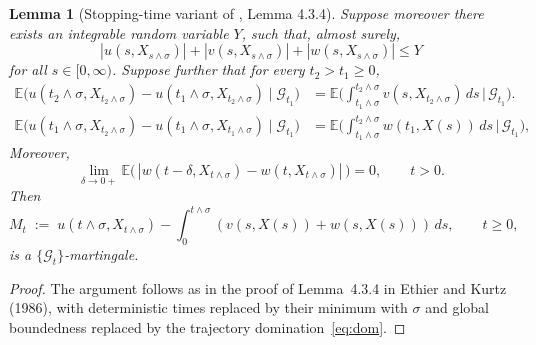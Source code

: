 \documentclass{imsart}
\theoremstyle{plain}
\newtheorem{lemma}[theorem]{Lemma}
\theoremstyle{definition}
\begin{document}
\begin{appendix}
\begin{lemma}[Stopping-time variant of \cite{EthierKurtz1986}, Lemma 4.3.4]
Suppose moreover there exists an integrable random variable $Y$, such that, almost surely,
\begin{equation}
\label{eq:dom}
  |u(s, X_{s \wedge \sigma})| + 
  |v(s, X_{s \wedge \sigma})| +
  |w(s, X_{s \wedge \sigma})| \leq Y
  \tag{D}
\end{equation}
for all $s \in [0, \infty)$. Suppose further that for every $t_2 > t_1 \geq 0$,
\begin{align}
  \mathbb E\big(u(t_2 \wedge \sigma, X_{t_2 \wedge \sigma}) - u(t_1 \wedge \sigma, X_{t_2 \wedge \sigma}) \mid \mathcal G_{t_1}\big)
  &= \mathbb E\Big(\int_{t_1 \wedge \sigma}^{t_2 \wedge \sigma}
      v(s, X_{t_2 \wedge\sigma})\, ds \,\Big|\, \mathcal G_{t_1} \Big).
  \label{eq:310prime}
  \tag{3.10$'$}\\[4pt]  
  \mathbb E\big(u(t_1\wedge \sigma, X_{t_2 \wedge \sigma}) - u(t_1\wedge \sigma, X_{t_1 \wedge\sigma}) \mid \mathcal G_{t_1}\big)
  & = \mathbb E\Big(\int_{t_1 \wedge \sigma}^{t_2 \wedge \sigma}
      w(t_1, X(s))\, ds \,\Big|\, \mathcal G_{t_1} \Big),
  \tag{3.11$'$}
\label{eq:311prime}
\end{align}
Moreover, 
\begin{equation}
  \lim_{\delta \to 0+}
    \mathbb E\Big(\, |w(t-\delta,  X_{t\wedge\sigma}) - w(t, X_{t\wedge\sigma})| \,\Big)
  = 0, \qquad t > 0.
  \tag{3.12$'$}
\label{eq:312prime}
\end{equation}
Then
\begin{equation}
\label{eq:316prime}
  M_t \;:=\; u(t \wedge \sigma, X_{t \wedge\sigma})
  - \int_0^{t \wedge \sigma}
    ( v(s, X(s)) + w(s, X(s)) )\, ds,
  \qquad t \geq 0,
  \tag{3.16$'$}
\end{equation}
is a $\{\mathcal G_t\}$-martingale.
\end{lemma}


\begin{proof}
The argument follows as in the proof of Lemma~4.3.4 in Ethier and
Kurtz (1986), with deterministic times replaced by their minimum with
$\sigma$ and global boundedness replaced by the trajectory domination~\eqref{eq:dom}.
\end{proof}



\end{appendix}
\end{document}
